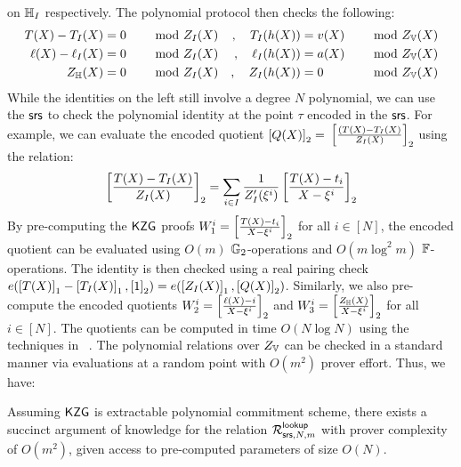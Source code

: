 on $\mathbb{H}_I$ respectively. The polynomial protocol then checks the following:
\begin{alignat}{2}\label{eq:poly-comm-index}
T(X) - T_I(X) &= 0 &\quad \text{ mod } Z_I(X) &&,\quad T_I(h(X)) &= v(X) &\quad \text{ mod } Z_{\mathbb{V}}(X) \\
\ell(X) - \ell_I(X) &= 0 &\quad \text{ mod } Z_I(X) &&,\quad \ell_I(h(X)) &= a(X) &\quad \text{ mod } Z_{\mathbb{V}}(X) \\
Z_{\mathbb{H}}(X) &= 0 &\quad \text{ mod } Z_I(X) &&,\quad Z_I(h(X)) &= 0 &\quad \text{ mod } Z_{\mathbb{V}}(X)
\end{alignat}
While the identities on the left still involve a degree $N$ polynomial, we can use the $\mathsf{srs}$ to check the polynomial
identity at the point $\tau$ encoded in the $\mathsf{srs}$. For example, we can evaluate the encoded quotient $\left[{Q(X)}\right]_2 =$
$\left[{\frac{(T(X) - T_I(X)}{Z_I(X)}}\right]_2$ using the relation:
\begin{equation*}
\left[{\frac{T(X)-T_I(X)}{Z_I(X)}}\right]_2 = \sum_{i\in I}\frac{1}{Z_I'(\xi^i)}\left[{\frac{T(X)-t_i}{X-\xi^i}}\right]_2
\end{equation*}
By pre-computing the $\mathsf{KZG}$ proofs $W_1^i=\left[{\frac{T(X)-t_i}{X-\xi^i}}\right]_2$ for all $i\in [N]$, the encoded quotient can be
evaluated using $O(m)$ $\mathbb{G}_2$-operations and $O(m\log^2 m)$ $\mathbb{F}$-operations. The identity is then checked using a real
pairing check $e(\left[{T(X)}\right]_1-\left[{T_I(X)}\right]_1,\left[{1}\right]_2)=e(\left[{Z_I(X)}\right]_1,\left[{Q(X)}\right]_2)$.
Similarly, we also pre-compute the encoded
quotients $W_2^i=\left[{\frac{\ell(X) - i}{X-\xi^i}}\right]_2$ and $W_3^i=\left[{\frac{Z_\mathbb{H}(X)}{X-\xi^i}}\right]_2$ for all $i\in [N]$.
The quotients can be computed in time $O(N\log N)$ using the techniques in ~\cite{EPRINT:FeiKho23}.
The polynomial relations over $Z_{\mathbb{V}}$ can be checked in a standard manner via evaluations at a random point with $O(m^2)$ prover effort.
Thus, we have:
\begin{lemma}\label{lem:comm-index-lookup}
Assuming $\mathsf{KZG}$ is extractable polynomial commitment scheme, there exists a succinct argument of knowledge for
the relation $\mathcal{R}^{\mathsf{lookup}}_{\mathsf{srs},N,m}$ with prover complexity of $O(m^2)$, given access to pre-computed parameters of size $O(N)$.
\end{lemma}

